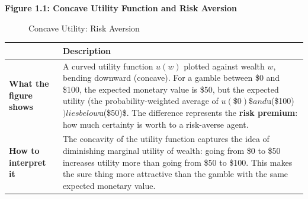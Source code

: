 \documentclass[12pt, letterpaper]{article}
\begin{document}
\textbf{Figure 1.1: Concave Utility Function and Risk Aversion}

\begin{figure}[h]
\centering
{}
\caption{Concave Utility: Risk Aversion}
\end{figure}


\begin{table}[H]
\centering
\small
\begin{tabularx}{\linewidth}{lY}
\toprule
 & Description \\
\midrule
\textbf{What the figure shows} & A curved utility function $u(w)$ plotted against wealth $w$, bending downward (concave). For a gamble between \$0 and \$100, the expected monetary value is \$50, but the expected utility (the probability-weighted average of $u(\$0)\$ and $u(\$100)$) lies below $u(\$50)\$. The difference represents the \textbf{risk premium}: how much certainty is worth to a risk-averse agent. \\
\textbf{How to interpret it} & The concavity of the utility function captures the idea of diminishing marginal utility of wealth: going from \$0 to \$50 increases utility more than going from \$50 to \$100. This makes the sure thing more attractive than the gamble with the same expected monetary value. \\
\bottomrule
\end{tabularx}
\end{table}
\newpage
\end{document}
